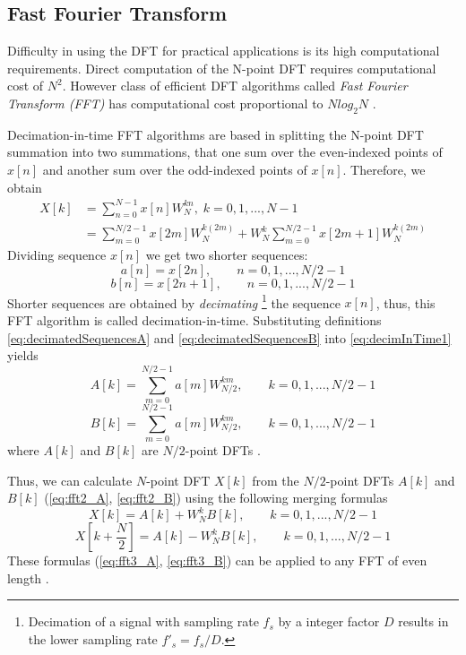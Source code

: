 \documentclass[twoside]{ctuthesis}
\theoremstyle{plain}
\theoremstyle{definition}
\theoremstyle{note}
\begin{document}
\subsection{Fast Fourier Transform}
\label{sec:FFT}
Difficulty in using the DFT for practical applications is its high computational requirements. Direct computation of the N-point DFT requires computational cost of $N^2$. However class of efficient DFT algorithms called \textit{Fast Fourier Transform (FFT)} has computational cost proportional to $Nlog_{2}N$ \cite{cite:RT_DSP,cite:3}.
\par 
Decimation-in-time FFT algorithms are based in splitting the N-point DFT summation into two summations, that one sum over the even-indexed points of $x[n]$ and another sum over the odd-indexed points of $x[n]$.
Therefore, we obtain
\begin{equation} \label{eq:decimInTime1}
\begin{aligned}
X[k] &= \sum_{n=0}^{N-1}x[n]W^{kn}_{N}, \; k=0,1,...,N-1\\
     &= \sum_{m=0}^{N/2-1}x[2m]W^{k(2m)}_{N} + W^{k}_{N}\sum_{m=0}^{N/2-1}x[2m+1]W^{k(2m)}_{N}
     \end{aligned}
\end{equation}
Dividing sequence $x[n]$ we get two shorter sequences:
\begin{equation} \label{eq:decimatedSequencesA}
a[n]=x[2n],\qquad n=0, 1, ..., N/2 -1
\end{equation}
\begin{equation} \label{eq:decimatedSequencesB}
b[n]=x[2n+1],\qquad n=0, 1, ..., N/2 -1
\end{equation}
Shorter sequences are obtained by \textit{decimating}
\footnote{Decimation of a signal with sampling rate $f_{s}$ by a integer factor $D$ results in the lower sampling rate $f'_{s}=f_{s}/D$.}
 the sequence $x[n]$, thus, this FFT algorithm is called decimation-in-time.
Substituting definitions \ref{eq:decimatedSequencesA} and \ref{eq:decimatedSequencesB} into \ref{eq:decimInTime1} yields
\begin{equation} \label{eq:fft2_A}
A[k]=\sum_{m=0}^{N/2-1}a[m]W^{km}_{N/2},\qquad k=0, 1, ..., N/2 -1
\end{equation}
\begin{equation} \label{eq:fft2_B}
B[k]=\sum_{m=0}^{N/2-1}a[m]W^{km}_{N/2},\qquad k=0, 1, ..., N/2 -1
\end{equation}
where $A[k]$ and $B[k]$ are $N/2$-point DFTs \cite{cite:3,cite:2}.

Thus, we can calculate $N$-point DFT $X[k]$ from the $N/2$-point DFTs $A[k]$ and $B[k]$ (\ref{eq:fft2_A}, \ref{eq:fft2_B}) using the following merging formulas
\begin{equation} \label{eq:fft3_A}
X[k]=A[k] + W^{k}_{N}B[k],\qquad k=0, 1, ..., N/2 -1
\end{equation}
\begin{equation} \label{eq:fft3_B}
X[k+\frac{N}{2}]=A[k] - W^{k}_{N}B[k],\qquad k=0, 1, ..., N/2 -1
\end{equation}
These formulas (\ref{eq:fft3_A}, \ref{eq:fft3_B}) can be applied to any FFT of even length \cite{cite:3}.
\end{document}
